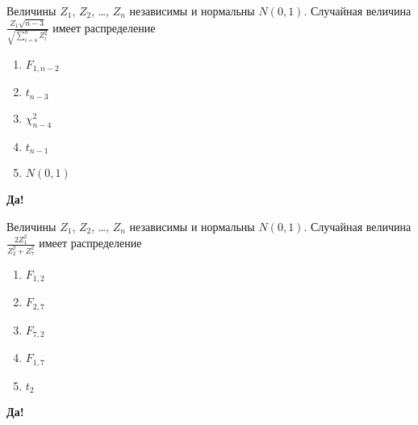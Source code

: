 \documentclass[t]{beamer}
\begin{document}
 \begin{frame} \label{36-Yes} 
\begin{block}{36} 

Величины $Z_1$, $Z_2$, \ldots, $Z_n$ независимы и нормальны $N(0,1)$. Случайная величина $\frac{Z_1\sqrt{n-3}}{\sqrt{\sum_{i=4}^n Z_i^2}}$ имеет распределение
 


 \end{block} 
\begin{enumerate} 
\item[] \hyperlink{36-No}{\beamergotobutton{} $F_{1,n-2}$}
\item[] \hyperlink{36-Yes}{\beamergotobutton{} $t_{n-3}$}
\item[] \hyperlink{36-No}{\beamergotobutton{} $\chi^2_{n-4}$}
\item[] \hyperlink{36-No}{\beamergotobutton{} $t_{n-1}$}
\item[] \hyperlink{36-No}{\beamergotobutton{} $N(0,1)$}
\end{enumerate} 

 \textbf{Да!} 
 \hyperlink{37}{}\end{frame} 


 \begin{frame} \label{37-Yes} 
\begin{block}{37} 

Величины $Z_1$, $Z_2$, \ldots, $Z_n$ независимы и нормальны $N(0,1)$. Случайная величина $\frac{2Z_1^2}{Z_2^2+Z_7^2}$ имеет распределение
 


 \end{block} 
\begin{enumerate} 
\item[] \hyperlink{37-Yes}{\beamergotobutton{} $F_{1,2}$}
\item[] \hyperlink{37-No}{\beamergotobutton{} $F_{2,7}$}
\item[] \hyperlink{37-No}{\beamergotobutton{} $F_{7,2}$}
\item[] \hyperlink{37-No}{\beamergotobutton{} $F_{1,7}$}
\item[] \hyperlink{37-No}{\beamergotobutton{} $t_2$}
\end{enumerate} 

 \textbf{Да!} 
 \hyperlink{38}{}\end{frame} 
\end{document}
